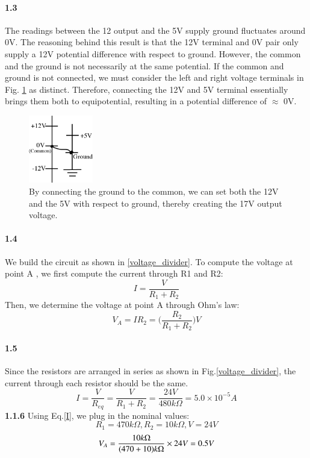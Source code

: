 \documentclass[authoryear, 12pt,5p, times]{elsarticle}
\begin{document}
\paragraph{\textbf{1.3}} 
The readings between the 12 output and the 5V supply ground fluctuates around 0V. The reasoning behind this result is that the 12V terminal and 0V pair only supply a 12V potential difference with respect to ground. However, the common and the ground is not necessarily at the same potential.  If the common and ground is not connected, we must consider the left and right voltage terminals in Fig. \ref{ground_common} as distinct. Therefore, connecting the 12V and 5V terminal essentially brings them both to equipotential, resulting in a potential difference of $\approx$  0V.
\begin{figure}[h!]
\center
\includegraphics[width=0.25\textwidth]{figure/ground_common}
\caption{By connecting the ground to the common, we can set both the 12V and the 5V with respect to ground, thereby creating the 17V output voltage.}
\label{ground_common}
\end{figure}

\paragraph{\textbf{1.4}} \label{1_4}
We build the circuit as shown in \ref{voltage_divider}. To compute the voltage at point A , we first compute the current through R1 and R2: 
\begin{equation}
I = \frac{V}{R_{1} + R_{2}}
\label{I} 
\end{equation}
Then, we determine the voltage at point A through Ohm's law:
\begin{equation}
 V_{A} = I R_{2} = \Bigg(\frac{R_{2}}{R_{1} + R_{2}}\Bigg)V
 \label{voltage_divider_eq}
\end{equation}
\paragraph{\textbf{1.5}} \label{1_5}
Since the resistors are arranged in series as shown in Fig.\ref{voltage_divider}, the current through each resistor should be the same.  
\begin{equation}
I=\frac{V}{R_{eq}}=\frac{V}{R_1+R_2}=\frac{24V}{480k\Omega
}= 5.0\times10^{-5}A 
\end{equation}
\textbf{1.1.6} %
Using Eq.\ref{I}, we plug in the nominal values:
\[ R_{1} = 470 k\Omega, R_{2} = 10k\Omega, V = 24V \]
\begin{equation*}
V_{A} = \frac{10k\Omega}{(470+10)k\Omega}\times 24V \\
= 0.5 V
\end{equation*}
\end{document}

